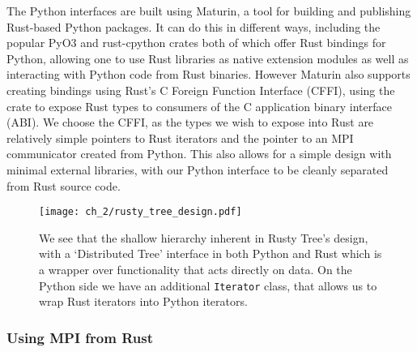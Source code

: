 The Python interfaces are built using Maturin, a tool for building and publishing Rust-based Python packages. It can do this in different ways, including the popular PyO3 \cite{pyo32022github} and rust-cpython \cite{rustcpython2022github} crates both of which offer Rust bindings for Python, allowing one to use Rust libraries as native extension modules as well as interacting with Python code from Rust binaries. However Maturin also supports creating bindings using Rust's C Foreign Function Interface (CFFI), using the  crate to expose Rust types to consumers of the C application binary interface (ABI). We choose the CFFI, as the types we wish to expose into Rust are relatively simple pointers to Rust iterators and the pointer to an MPI communicator created from Python. This also allows for a simple design with minimal external libraries, with our Python interface to be cleanly separated from Rust source code.



\begin{figure}
    \centerline{\texttt{[image: ch\_2/rusty\_tree\_design.pdf]}}
    \caption{We see that the shallow hierarchy inherent in Rusty Tree's design, with a `Distributed Tree' interface in both Python and Rust which is a wrapper over functionality that acts directly on data. On the Python side we have an additional \texttt{Iterator} class, that allows us to wrap Rust iterators into Python iterators.}
    \label{fig:sec_2_4:design}
\end{figure}

\subsubsection*{Using MPI from Rust}

